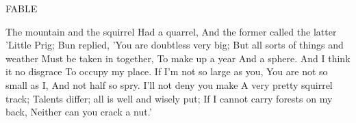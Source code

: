 FABLE

The mountain and the squirrel
Had a quarrel,
And the former called the latter 'Little Prig;
Bun replied,
'You are doubtless very big;
But all sorts of things and weather
Must be taken in together,
To make up a year
And a sphere.
And I think it no disgrace
To occupy my place.
If I'm not so large as you,
You are not so small as I,
And not half so spry.
I'll not deny you make
A very pretty squirrel track;
Talents differ; all is well and wisely put;
If I cannot carry forests on my back,
Neither can you crack a nut.'

